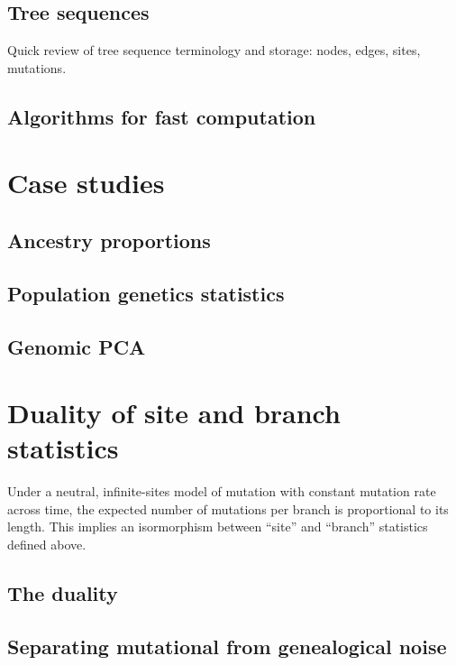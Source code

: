 \documentclass{article}
\begin{document}
\subsection*{Tree sequences}

Quick review of tree sequence terminology
and storage:
nodes,
edges,
sites,
mutations.


\subsection*{Algorithms for fast computation}



\section*{Case studies}


\subsection*{Ancestry proportions}


\subsection*{Population genetics statistics}


\subsection*{Genomic PCA}


\section*{Duality of site and branch statistics}

Under a neutral, infinite-sites model of mutation with constant mutation rate across time,
the expected number of mutations per branch is proportional to its length.
This implies an isormorphism between ``site'' and ``branch'' statistics defined above.


\subsection*{The duality}



\subsection*{Separating mutational from genealogical noise}
\end{document}
